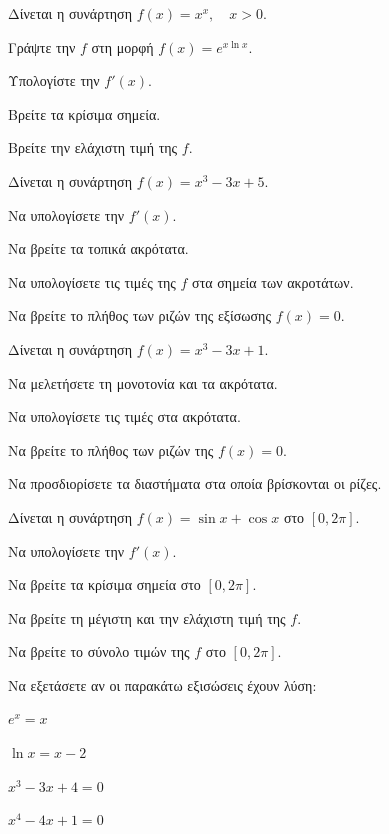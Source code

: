 \documentclass[11pt,a4paper,modern]{FFExercises}
\begin{document}
\askhsh
Δίνεται η συνάρτηση $f(x) = x^x, \quad x > 0$.
\begin{alist}
    \item Γράψτε την $f$ στη μορφή $f(x) = e^{x \ln x}$.
    \item Υπολογίστε την $f'(x)$.
    \item Βρείτε τα κρίσιμα σημεία.
    \item Βρείτε την ελάχιστη τιμή της $f$.
\end{alist}

\askhsh
Δίνεται η συνάρτηση $f(x) = x^3 - 3x + 5$.
\begin{alist}
    \item Να υπολογίσετε την $f'(x)$.
    \item Να βρείτε τα τοπικά ακρότατα.
    \item Να υπολογίσετε τις τιμές της $f$ στα σημεία των ακροτάτων.
    \item Να βρείτε το πλήθος των ριζών της εξίσωσης $f(x) = 0$.
\end{alist}

\askhsh
Δίνεται η συνάρτηση $f(x) = x^3 - 3x + 1$.
\begin{alist}
    \item Να μελετήσετε τη μονοτονία και τα ακρότατα.
    \item Να υπολογίσετε τις τιμές στα ακρότατα.
    \item Να βρείτε το πλήθος των ριζών της $f(x) = 0$.
    \item Να προσδιορίσετε τα διαστήματα στα οποία βρίσκονται οι ρίζες.
\end{alist}

\askhsh
Δίνεται η συνάρτηση $f(x) = \sin x + \cos x$ στο $[0, 2\pi]$.
\begin{alist}
    \item Να υπολογίσετε την $f'(x)$.
    \item Να βρείτε τα κρίσιμα σημεία στο $[0, 2\pi]$.
    \item Να βρείτε τη μέγιστη και την ελάχιστη τιμή της $f$.
    \item Να βρείτε το σύνολο τιμών της $f$ στο $[0, 2\pi]$.
\end{alist}

\askhsh
Να εξετάσετε αν οι παρακάτω εξισώσεις έχουν λύση:
\begin{alist}
    \item $e^x = x$
    \item $\ln x = x - 2$
    \item $x^3 - 3x + 4 = 0$
    \item $x^4 - 4x + 1 = 0$
\end{alist}
\end{document}
